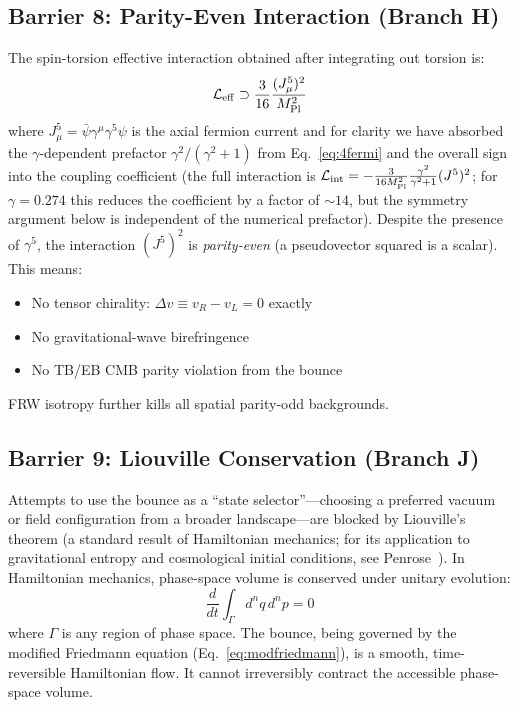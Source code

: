 \documentclass[aps,prd,twocolumn,superscriptaddress,showpacs,preprintnumbers,nofootinbib,longbibliography,floatfix]{revtex4-2}
\newcommand{\MPl}{M_{\rm Pl}}
\begin{document}
\subsection{Barrier 8: Parity-Even Interaction (Branch H)}

The spin-torsion effective interaction obtained after integrating out torsion is:
\begin{equation}
\mathcal{L}_{\rm eff} \supset \frac{3}{16} \frac{(J^5_\mu)^2}{\MPl^2}
\end{equation}
where $J^5_\mu = \bar{\psi}\gamma^\mu\gamma^5\psi$ is the axial fermion current and for clarity we have absorbed the $\gamma$-dependent prefactor $\gamma^2/(\gamma^2+1)$ from Eq.~\eqref{eq:4fermi} and the overall sign into the coupling coefficient (the full interaction is $\mathcal{L}_{\rm int} = -\frac{3}{16\MPl^2}\frac{\gamma^2}{\gamma^2+1}(J^5)^2$; for $\gamma = 0.274$ this reduces the coefficient by a factor of $\sim 14$, but the symmetry argument below is independent of the numerical prefactor). Despite the presence of $\gamma^5$, the interaction $(J^5)^2$ is \emph{parity-even} (a pseudovector squared is a scalar). This means:
\begin{itemize}
\item No tensor chirality: $\Delta v \equiv v_R - v_L = 0$ exactly
\item No gravitational-wave birefringence
\item No TB/EB CMB parity violation from the bounce
\end{itemize}
FRW isotropy further kills all spatial parity-odd backgrounds.

\subsection{Barrier 9: Liouville Conservation (Branch J)}

Attempts to use the bounce as a ``state selector''---choosing a preferred vacuum or field configuration from a broader landscape---are blocked by Liouville's theorem (a standard result of Hamiltonian mechanics; for its application to gravitational entropy and cosmological initial conditions, see Penrose~\cite{Penrose1979}). In Hamiltonian mechanics, phase-space volume is conserved under unitary evolution:
\begin{equation}
\frac{d}{dt}\int_{\Gamma} d^nq\,d^np = 0
\end{equation}
where $\Gamma$ is any region of phase space. The bounce, being governed by the modified Friedmann equation (Eq.~\ref{eq:modfriedmann}), is a smooth, time-reversible Hamiltonian flow. It cannot irreversibly contract the accessible phase-space volume.
\end{document}
